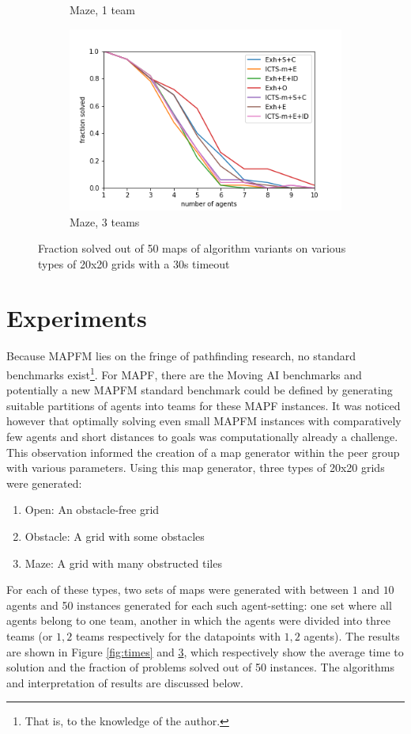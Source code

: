 \documentclass[english]{article}
\begin{document}
\begin{figure}
\begin{subfigure}{0.49\textwidth}
			\caption{Maze, 1 team}
			\label{fig:maze1p}
		\end{subfigure}
		\begin{subfigure}{0.49\textwidth}
			\centering
			\includegraphics[width=\linewidth]{img/results/maze-3-p}
			\caption{Maze, 3 teams}
			\label{fig:maze3p}
		\end{subfigure}
		\caption{Fraction solved out of 50 maps of algorithm variants on various types of 20x20 grids with a 30s timeout}
		\label{fig:probs}
	\end{figure}
	
	\section{Experiments}
	\label{experiments}
	Because MAPFM lies on the fringe of pathfinding research, no standard benchmarks exist\footnote{That is, to the knowledge of the author.}. For MAPF, there are the Moving AI benchmarks \cite{sturtevant2012} and potentially a new MAPFM standard benchmark could be defined by generating suitable partitions of agents into teams for these MAPF instances. It was noticed however that optimally solving even small MAPFM instances with comparatively few agents and short distances to goals was computationally already a challenge. This observation informed the creation of a map generator within the peer group with various parameters. Using this map generator, three types of 20x20 grids were generated:
	\begin{enumerate}
		\item Open: An obstacle-free grid
		\item Obstacle: A grid with some obstacles
		\item Maze: A grid with many obstructed tiles
	\end{enumerate}
	For each of these types, two sets of maps were generated with between $1$ and $10$ agents and 50 instances generated for each such agent-setting: one set where all agents belong to one team, another in which the agents were divided into three teams (or $1,2$ teams respectively for the datapoints with $1,2$ agents). The results are shown in Figure \ref{fig:times} and \ref{fig:probs}, which respectively show the average time to solution and the fraction of problems solved out of 50 instances. The algorithms and interpretation of results are discussed below.
\end{document}
